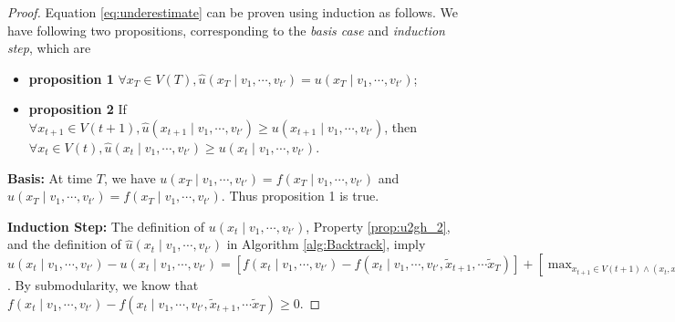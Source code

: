 \begin{proof} Equation \eqref{eq:underestimate} can be proven using induction as follows.
We have following two propositions, corresponding to the {\em basis case} and {\em induction step}, which are
\begin{itemize}
\item \textbf{proposition 1} $ \forall x_{T} \in V(T), \hat{u}( x_{T} \mid v_{1} , \cdots , v_{t'} ) = u( x_{T} \mid v_{1} , \cdots , v_{t'} ) $; 
\item \textbf{proposition 2} If $ \forall x_{t+1} \in V(t+1), \hat{u}( x_{t+1} \mid v_{1} , \cdots , v_{t'} ) \geq u( x_{t+1} \mid v_{1} , \cdots , v_{t'} ) $, 
then $ \forall x_{t} \in V(t), \hat{u}( x_{t} \mid v_{1} , \cdots , v_{t'} ) \geq u( x_{t} \mid v_{1} , \cdots , v_{t'} ) $.
\end{itemize}

{\bf Basis:} At time $ T $, we have
$ u( x_{T} \mid  v_{1} , \cdots , v_{t'} ) = f( x_{T} \mid v_{1} , \cdots , v_{t'} ) $
and
$ \hat{u}( x_{T} \mid v_{1} , \cdots , v_{t'} ) = f( x_{T} \mid v_{1} , \cdots , v_{t'} ) $.
Thus proposition 1 is true.

{\bf Induction Step:}
The definition of $ u(x_{t} \mid v_{1} , \cdots , v_{t'} ) $, Property \ref{prop:u2gh_2}, and the definition of $ \hat{u}( x_{t} \mid v_{1} , \cdots , v_{t'} ) $ in Algorithm \ref{alg:Backtrack}, imply
$ \hat{u}( x_{t} \mid v_{1} , \cdots , v_{t'} ) - u(x_{t} \mid v_{1} , \cdots , v_{t'} )
= \left[ f(x_{t} \mid v_{1} , \cdots , v_{t'} ) - f(x_{t} \mid v_{1} , \cdots , v_{t'}, \tilde{x}_{t+1}, \cdots \tilde{x}_{T} ) \right]
 + [ \max_{ x_{t+1} \in V(t+1) \land ( x_{t}, x_{t+1} ) \in E } \hat{u}( x_{t+1} \mid v_{1} , \cdots , v_{t'} )  - \max_{x_{t+1} \in V(t+1) \land ( x_{t}, x_{t+1} ) \in E } u( x_{t+1} \mid v_{1} , \cdots , v_{t'} ) ] $.
By submodularity, we know that
$ f( x_{t} \mid v_{1} , \cdots , v_{t'} )  
- f(x_{t} \mid v_{1} , \cdots , v_{t'}, \tilde{x}_{t+1}, \cdots \tilde{x}_{T} ) \geq 0 $. 


\end{proof}
